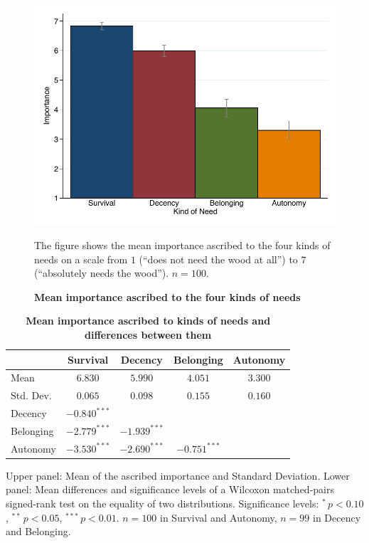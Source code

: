 \documentclass[10pt,letterpaper]{article}
\begin{document}
\begin{figure}[t]
   \includegraphics[width=\linewidth]{figures/figure_2.pdf}
   \caption{\bf Mean importance ascribed to the four kinds of needs}
The figure shows the mean importance ascribed to the four kinds of needs on a scale from $1$ (``does not need the wood at all'') to $7$ (``absolutely needs the wood''). $n=100$.
   \label{fig:study_1_bar}
\end{figure}

\begin{table}[ht!]
\begin{adjustwidth}{0in}{0in}
\caption{\bf Mean importance ascribed to kinds of needs and differences between them}
\label{tab:study1means}
\begin{tabular}{lcccc}\\[0.5ex]\hline
                & Survival         & Decency          & Belonging        & Autonomy   \\\hline
   Mean         & $ 6.830$         & $ 5.990$         & $ 4.051$         & $3.300$    \\
   Std. Dev.    & $ 0.065$         & $ 0.098$         & $ 0.155$         & $0.160$    \\\hline\hline
   Decency      & $-0.840^{***}$   &                  &                  &            \\
   Belonging    & $-2.779^{***}$   & $-1.939^{***}$   &                  &            \\
   Autonomy     & $-3.530^{***}$   & $-2.690^{***}$   & $-0.751^{***}$   &            \\\hline
\end{tabular}
\begin{flushleft}
   Upper panel: Mean of the ascribed importance and Standard Deviation. Lower panel: Mean differences and significance levels of a Wilcoxon matched-pairs signed-rank test on the equality of two distributions. Significance levels: $^{*}$\,$p<0.10$, $^{**}$\,$p<0.05$, $^{***}$\,$p<0.01$. $n=100$ in Survival and Autonomy, $n=99$ in Decency and Belonging.
\end{flushleft}
\end{adjustwidth}
\end{table}
\end{document}
